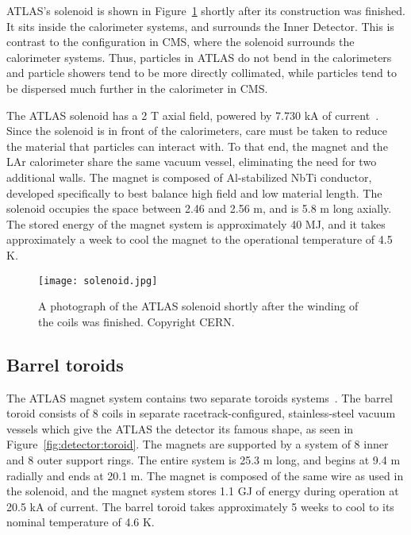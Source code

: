 ATLAS's solenoid is shown in Figure~\ref{fig:detector:solenoid} shortly after its construction was finished. It sits inside the calorimeter systems, and surrounds the Inner Detector. This is contrast to the configuration in CMS, where the solenoid surrounds the calorimeter systems. Thus, particles in ATLAS do not bend in the calorimeters and particle showers tend to be more directly collimated, while particles tend to be dispersed much further in the calorimeter in CMS.

The ATLAS solenoid has a 2 T axial field, powered by 7.730 kA of current~\cite{ATLASPaper}. Since the solenoid is in front of the calorimeters, care must be taken to reduce the material that particles can interact with. To that end, the magnet and the LAr calorimeter share the same vacuum vessel, eliminating the need for two additional walls. The magnet is composed of Al-stabilized NbTi conductor, developed specifically to best balance high field and low material length. The solenoid occupies the space between 2.46 and 2.56 m, and is 5.8 m long axially. The stored energy of the magnet system is approximately 40 MJ, and it takes approximately a week to cool the magnet to the operational temperature of 4.5 K. 


\begin{figure}
\centering
\texttt{[image: solenoid.jpg]}
\label{fig:detector:solenoid}
\caption{A photograph of the ATLAS solenoid shortly after the winding of the coils was finished. Copyright CERN.}
\end{figure}



\subsection{Barrel toroids}

The ATLAS magnet system contains two separate toroids systems~\cite{ATLASPaper,ATLASMS}. The barrel toroid consists of 8 coils in separate racetrack-configured, stainless-steel vacuum vessels which give the ATLAS the detector its famous shape, as seen in Figure~\ref{fig:detector:toroid}. The magnets are supported by a system of 8 inner and 8 outer support rings. The entire system is 25.3 m long, and begins at 9.4 m radially and ends at 20.1 m. The magnet is composed of the same wire as used in the solenoid, and the magnet system stores 1.1 GJ of energy during operation at 20.5 kA of current. The barrel toroid takes approximately 5 weeks to cool to its nominal temperature of 4.6 K.


